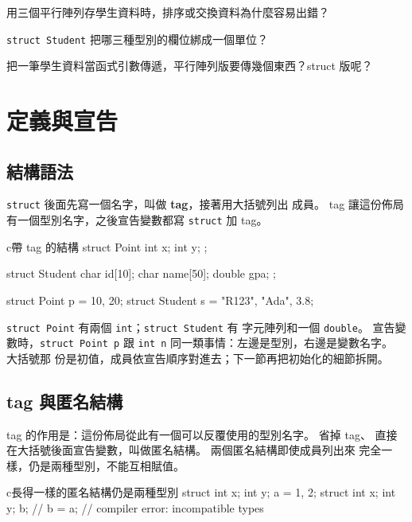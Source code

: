 \begin{drills}[label=drills:struct-motivation]
\item 用三個平行陣列存學生資料時，排序或交換資料為什麼容易出錯？
\item \texttt{struct Student} 把哪三種型別的欄位綁成一個單位？
\item 把一筆學生資料當函式引數傳遞，平行陣列版要傳幾個東西？struct
版呢？
\end{drills}

\section{定義與宣告}
\label{sec:struct-declare}

\subsection{結構語法}

\texttt{struct} 後面先寫一個名字，叫做 \textbf{tag}，接著用大括號列出
成員。 tag 讓這份佈局有一個型別名字，之後宣告變數都寫
\texttt{struct} 加 tag。

\begin{code}{c}{帶 tag 的結構}
struct Point {
    int x;
    int y;
};

struct Student {
    char id[10];
    char name[50];
    double gpa;
};

struct Point p = {10, 20};
struct Student s = {"R123", "Ada", 3.8};
\end{code}

\texttt{struct Point} 有兩個 \texttt{int}；\texttt{struct Student} 有
字元陣列和一個 \texttt{double}。 宣告變數時，\texttt{struct Point p}
跟 \texttt{int n} 同一類事情：左邊是型別，右邊是變數名字。 大括號那
份是初值，成員依宣告順序對進去；下一節再把初始化的細節拆開。

\subsection{tag 與匿名結構}

tag 的作用是：這份佈局從此有一個可以反覆使用的型別名字。 省掉 tag、
直接在大括號後面宣告變數，叫做匿名結構。 兩個匿名結構即使成員列出來
完全一樣，仍是兩種型別，不能互相賦值。

\begin{code}{c}{長得一樣的匿名結構仍是兩種型別}
struct { int x; int y; } a = {1, 2};
struct { int x; int y; } b;
// b = a;   // compiler error: incompatible types
\end{code}

